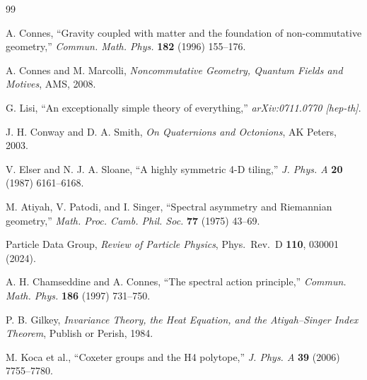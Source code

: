 \documentclass[11pt,a4paper]{article}
\theoremstyle{definition}
\begin{document}
\begin{thebibliography}{99}

A. Connes, ``Gravity coupled with matter and the foundation of
non-commutative geometry,'' \textit{Commun. Math. Phys.} \textbf{182} (1996)
155--176.

A. Connes and M. Marcolli, \textit{Noncommutative Geometry, Quantum Fields
and Motives}, AMS, 2008.

G. Lisi, ``An exceptionally simple theory of everything,''
\textit{arXiv:0711.0770 [hep-th]}.

J. H. Conway and D. A. Smith, \textit{On Quaternions and Octonions},
AK Peters, 2003.

V. Elser and N. J. A. Sloane, ``A highly symmetric 4-D tiling,''
\textit{J. Phys. A} \textbf{20} (1987) 6161--6168.

M. Atiyah, V. Patodi, and I. Singer, ``Spectral asymmetry and
Riemannian geometry,'' \textit{Math. Proc. Camb. Phil. Soc.} \textbf{77}
(1975) 43--69.

Particle Data Group, \textit{Review of Particle Physics}, Phys.\ Rev.\ D
\textbf{110}, 030001 (2024).

A. H. Chamseddine and A. Connes, ``The spectral action principle,''
\textit{Commun. Math. Phys.} \textbf{186} (1997) 731--750.

P. B. Gilkey, \textit{Invariance Theory, the Heat Equation, and the
Atiyah--Singer Index Theorem}, Publish or Perish, 1984.

M. Koca et al., ``Coxeter groups and the H4 polytope,''
\textit{J. Phys. A} \textbf{39} (2006) 7755--7780.

\end{thebibliography}
\end{document}
